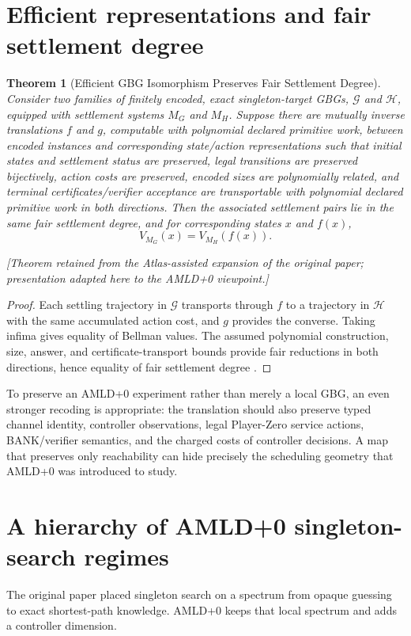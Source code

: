 \documentclass[11pt]{article}
\newtheorem{theorem}[definition]{Theorem}
\newcommand{\atlasnote}{\par\smallskip\noindent\textit{[Theorem retained from the Atlas-assisted expansion of the original paper; presentation adapted here to the AMLD+0 viewpoint.] }\par\smallskip}
\begin{document}
\section{Efficient representations and fair settlement degree}

\begin{theorem}[Efficient GBG Isomorphism Preserves Fair Settlement Degree]
Consider two families of finitely encoded, exact singleton-target GBGs,
$\mathcal G$ and $\mathcal H$, equipped with settlement systems $M_G$ and
$M_H$.  Suppose there are mutually inverse translations $f$ and $g$, computable
with polynomial declared primitive work, between encoded instances and
corresponding state/action representations such that initial states and
settlement status are preserved, legal transitions are preserved bijectively,
action costs are preserved, encoded sizes are polynomially related, and
terminal certificates/verifier acceptance are transportable with polynomial
declared primitive work in both directions.  Then the associated settlement
pairs lie in the same fair settlement degree, and for corresponding states
$x$ and $f(x)$,
\[
\boxed{V_{M_G}(x)=V_{M_H}(f(x)).}
\]
\end{theorem}
\atlasnote

\begin{proof}
Each settling trajectory in $\mathcal G$ transports through $f$ to a
trajectory in $\mathcal H$ with the same accumulated action cost, and $g$
provides the converse.  Taking infima gives equality of Bellman values.  The
assumed polynomial construction, size, answer, and certificate-transport
bounds provide fair reductions in both directions, hence equality of fair
settlement degree \cite{tenneson-fair}.
\end{proof}

To preserve an AMLD+0 experiment rather than merely a local GBG, an even
stronger recoding is appropriate: the translation should also preserve typed
channel identity, controller observations, legal Player-Zero service actions,
BANK/verifier semantics, and the charged costs of controller decisions.  A map
that preserves only reachability can hide precisely the scheduling geometry
that AMLD+0 was introduced to study.

\section{A hierarchy of AMLD+0 singleton-search regimes}

The original paper placed singleton search on a spectrum from opaque guessing
to exact shortest-path knowledge.  AMLD+0 keeps that local spectrum and adds a
controller dimension.
\end{document}
